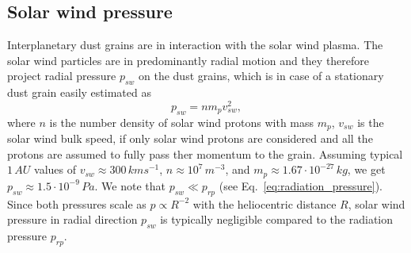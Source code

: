 \subsection{Solar wind pressure} \label{ch:solar_wind_pressure}

Interplanetary dust grains are in interaction with the solar wind plasma. The solar wind particles are in predominantly radial motion and they therefore project radial pressure $p_{sw}$ on the dust grains, which is in case of a stationary dust grain easily estimated \citep{shue1998magnetopause} as
\begin{equation}
    p_{sw} = n m_p v^2_{sw},  
\end{equation}
where $n$ is the number density of solar wind protons with mass $m_p$, $v_{sw}$ is the solar wind bulk speed, if only solar wind protons are considered and all the protons are assumed to fully pass ther momentum to the grain. Assuming typical $1 \, \si{AU}$ values of $v_{sw} \approx 300 \, \si{km s^{-1}}$, $n \approx 10^7 \, \si{m^{-3}}$, and $m_p \approx 1.67 \cdot 10^{-27} \, \si{kg}$, we get $p_{sw} \approx 1.5 \cdot 10^{-9} \, \si{Pa}$. We note that $p_{sw} \ll p_{rp}$ (see Eq.~\ref{eq:radiation_pressure}). Since both pressures scale as $p \propto R^{-2}$ with the heliocentric distance $R$, solar wind pressure in radial direction $p_{sw}$ is typically negligible compared to the radiation pressure $p_{rp}$.

